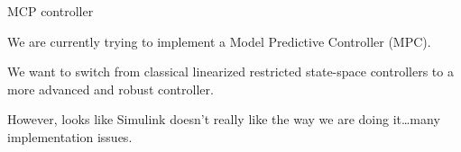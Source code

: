 \begin{frame}{MCP controller}

    We are currently trying to implement a Model Predictive Controller (MPC).

    We want to switch from classical linearized restricted state-space controllers to a more advanced and robust controller.

    However, looks like Simulink doesn't really like the way we are doing it\dots many implementation issues.

\end{frame}